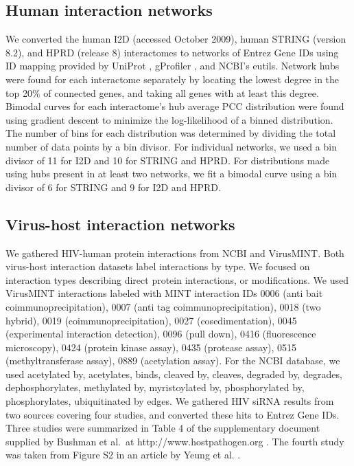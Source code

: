   \subsection{Human interaction networks}
    We converted the human I2D (accessed October 2009), human STRING
    (version 8.2), and HPRD (release 8) interactomes to networks of
    Entrez Gene IDs using ID mapping provided by UniProt
    \cite{citeulike:6008733}, gProfiler \cite{reimand2007g}, and
    NCBI's eutils. Network hubs were found for each interactome
    separately by locating the lowest degree in the top 20\% of
    connected genes, and taking all genes with at least this
    degree. Bimodal curves for each interactome's hub average PCC
    distribution were found using gradient descent to minimize the
    log-likelihood of a binned distribution. The number of bins for
    each distribution was determined by dividing the total number of
    data points by a bin divisor. For individual networks, we used a
    bin divisor of 11 for I2D and 10 for STRING and HPRD. For
    distributions made using hubs present in at least two networks, we
    fit a bimodal curve using a bin divisor of 6 for STRING and 9 for
    I2D and HPRD.

  \subsection{Virus-host interaction networks}
    We gathered HIV-human protein interactions from NCBI and
    VirusMINT. Both virus-host interaction datasets label interactions
    by type. We focused on interaction types describing direct protein
    interactions, or modifications. We used VirusMINT interactions
    labeled with MINT interaction IDs 0006 (anti bait
    coimmunoprecipitation), 0007 (anti tag coimmunoprecipitation),
    0018 (two hybrid), 0019 (coimmunoprecipitation), 0027
    (cosedimentation), 0045 (experimental interaction detection), 0096
    (pull down), 0416 (fluorescence microscopy), 0424 (protein kinase
    assay), 0435 (protease assay), 0515 (methyltransferase assay),
    0889 (acetylation assay). For the NCBI database, we used
    acetylated by, acetylates, binds, cleaved by, cleaves, degraded
    by, degrades, dephosphorylates, methylated by, myristoylated by,
    phosphorylated by, phosphorylates, ubiquitinated by edges. We
    gathered HIV siRNA results from two sources covering four studies,
    and converted these hits to Entrez Gene IDs. Three studies were
    summarized in Table 4 of the supplementary document supplied by
    Bushman et al.\ at http://www.hostpathogen.org
    \cite{bushman09}. The fourth study was taken from Figure S2 in an
    article by Yeung et al. \cite{yeung09}.

